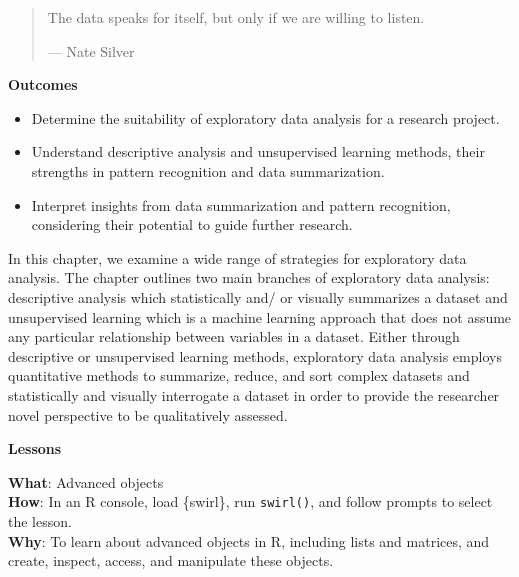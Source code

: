 \documentclass[
  letterpaper,
]{latex/krantz}
\providecommand{\tightlist}{%
  \setlength{\itemsep}{0pt}\setlength{\parskip}{0pt}}\usepackage{longtable,booktabs,array}
\theoremstyle{definition}
\theoremstyle{remark}
\begin{document}
\begin{quote}
The data speaks for itself, but only if we are willing to listen.

--- Nate Silver
\end{quote}

\begin{tcolorbox}[enhanced jigsaw, bottomrule=.15mm, leftrule=.75mm, toprule=.15mm, breakable, colframe=quarto-callout-color-frame, arc=.35mm, left=2mm, rightrule=.15mm, opacityback=0, colback=white]

\textbf{ Outcomes}

\begin{itemize}
\tightlist
\item
  Determine the suitability of exploratory data analysis for a research
  project.
\item
  Understand descriptive analysis and unsupervised learning methods,
  their strengths in pattern recognition and data summarization.
\item
  Interpret insights from data summarization and pattern recognition,
  considering their potential to guide further research.
\end{itemize}

\end{tcolorbox}

In this chapter, we examine a wide range of strategies for exploratory
data analysis. The chapter outlines two main branches of exploratory
data analysis: descriptive analysis which statistically and/ or visually
summarizes a dataset and unsupervised learning which is a machine
learning approach that does not assume any particular relationship
between variables in a dataset. Either through descriptive or
unsupervised learning methods, exploratory data analysis employs
quantitative methods to summarize, reduce, and sort complex datasets and
statistically and visually interrogate a dataset in order to provide the
researcher novel perspective to be qualitatively assessed.

\begin{tcolorbox}[enhanced jigsaw, bottomrule=.15mm, leftrule=.75mm, toprule=.15mm, breakable, colframe=quarto-callout-color-frame, arc=.35mm, left=2mm, rightrule=.15mm, opacityback=0, colback=white]

\textbf{ Lessons}

\textbf{What}: Advanced objects\\
\textbf{How}: In an R console, load \{swirl\}, run \texttt{swirl()}, and
follow prompts to select the lesson.\\
\textbf{Why}: To learn about advanced objects in R, including lists and
matrices, and create, inspect, access, and manipulate these objects.

\end{tcolorbox}
\end{document}
